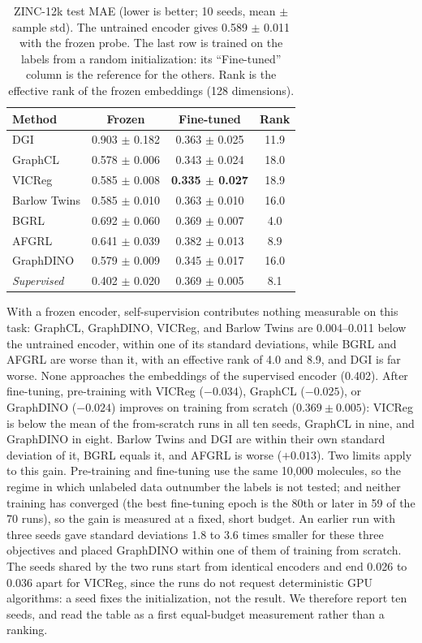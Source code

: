 \documentclass[conference]{IEEEtran}
\begin{document}
\begin{table}[htbp]
\centering
\caption{ZINC-12k test MAE (lower is better; 10 seeds, mean $\pm$ sample std). The untrained encoder gives 0.589 $\pm$ 0.011 with the frozen probe. The last row is trained on the labels from a random initialization: its ``Fine-tuned'' column is the reference for the others. Rank is the effective rank of the frozen embeddings (128 dimensions).}
\label{tab:zinc}
\begin{tabular}{@{}lccc@{}}
\toprule
\textbf{Method} & \textbf{Frozen} & \textbf{Fine-tuned} & \textbf{Rank} \\ \midrule
DGI & 0.903 $\pm$ 0.182 & 0.363 $\pm$ 0.025 & 11.9 \\
GraphCL & 0.578 $\pm$ 0.006 & 0.343 $\pm$ 0.024 & 18.0 \\
VICReg & 0.585 $\pm$ 0.008 & \textbf{0.335 $\pm$ 0.027} & 18.9 \\
Barlow Twins & 0.585 $\pm$ 0.010 & 0.363 $\pm$ 0.010 & 16.0 \\
BGRL & 0.692 $\pm$ 0.060 & 0.369 $\pm$ 0.007 & 4.0 \\
AFGRL & 0.641 $\pm$ 0.039 & 0.382 $\pm$ 0.013 & 8.9 \\
GraphDINO & 0.579 $\pm$ 0.009 & 0.345 $\pm$ 0.017 & 16.0 \\ \midrule
\textit{Supervised} & 0.402 $\pm$ 0.020 & 0.369 $\pm$ 0.005 & 8.1 \\ \bottomrule
\end{tabular}
\end{table}

With a frozen encoder, self-supervision contributes nothing measurable on this task: GraphCL, GraphDINO, VICReg, and Barlow Twins are 0.004--0.011 below the untrained encoder, within one of its standard deviations, while BGRL and AFGRL are worse than it, with an effective rank of 4.0 and 8.9, and DGI is far worse. None approaches the embeddings of the supervised encoder (0.402). After fine-tuning, pre-training with VICReg ($-0.034$), GraphCL ($-0.025$), or GraphDINO ($-0.024$) improves on training from scratch ($0.369 \pm 0.005$): VICReg is below the mean of the from-scratch runs in all ten seeds, GraphCL in nine, and GraphDINO in eight. Barlow Twins and DGI are within their own standard deviation of it, BGRL equals it, and AFGRL is worse ($+0.013$). Two limits apply to this gain. Pre-training and fine-tuning use the same 10{,}000 molecules, so the regime in which unlabeled data outnumber the labels is not tested; and neither training has converged (the best fine-tuning epoch is the 80th or later in 59 of the 70 runs), so the gain is measured at a fixed, short budget. An earlier run with three seeds gave standard deviations 1.8 to 3.6 times smaller for these three objectives and placed GraphDINO within one of them of training from scratch. The seeds shared by the two runs start from identical encoders and end 0.026 to 0.036 apart for VICReg, since the runs do not request deterministic GPU algorithms: a seed fixes the initialization, not the result. We therefore report ten seeds, and read the table as a first equal-budget measurement rather than a ranking.
\end{document}
